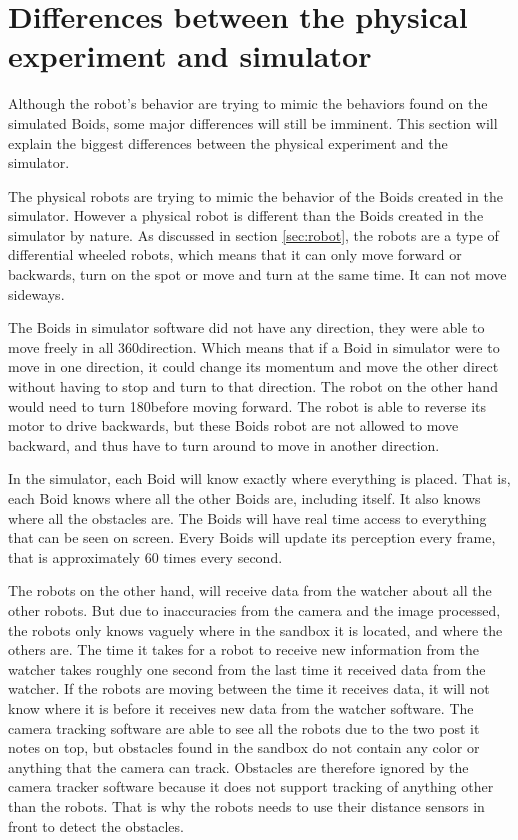 \section{Differences between the physical experiment and simulator}
Although the robot's behavior are trying to mimic the behaviors found on the simulated Boids, some major differences will still be imminent. This section will explain the biggest differences between the physical experiment and the simulator. 

The physical robots are trying to mimic the behavior of the Boids created in the simulator. However a physical robot is different than the Boids created in the simulator by nature. As discussed in section \ref{sec:robot}, the robots are a type of differential wheeled robots, which means that it can only move forward or backwards, turn on the spot or move and turn at the same time. It can not move sideways.

The Boids in simulator software did not have any direction, they were able to move freely in all 360\textdegree direction. Which means that if a Boid in simulator were to move in one direction, it could change its momentum and move the other direct without having to stop and turn to that direction. The robot on the other hand would need to turn 180\textdegree before moving forward. The robot is able to reverse its motor to drive backwards, but these Boids robot are not allowed to move backward, and thus have to turn around to move in another direction.

In the simulator, each Boid will know exactly where everything is placed. That is, each Boid knows where all the other Boids are, including itself. It also knows where all the obstacles are. The Boids will have real time access to everything that can be seen on screen. Every Boids will update its perception every frame, that is approximately 60 times every second.

The robots on the other hand, will receive data from the watcher about all the other robots. But due to inaccuracies from the camera and the image processed, the robots only knows vaguely where in the sandbox it is located, and where the others are. The time it takes for a robot to receive new information from the watcher takes roughly one second from the last time it received data from the watcher. If the robots are moving between the time it receives data, it will not know where it is before it receives new data from the watcher software. The camera tracking software are able to see all the robots due to the two post it notes on top, but obstacles found in the sandbox do not contain any color or anything that the camera can track. Obstacles are therefore ignored by the camera tracker software because it does not support tracking of anything other than the robots. That is why the robots needs to use their distance sensors in front to detect the obstacles.

